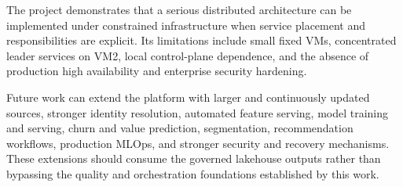 The project demonstrates that a serious distributed architecture can be implemented under constrained infrastructure when service placement and responsibilities are explicit. Its limitations include small fixed VMs, concentrated leader services on VM2, local control-plane dependence, and the absence of production high availability and enterprise security hardening.

Future work can extend the platform with larger and continuously updated sources, stronger identity resolution, automated feature serving, model training and serving, churn and value prediction, segmentation, recommendation workflows, production MLOps, and stronger security and recovery mechanisms. These extensions should consume the governed lakehouse outputs rather than bypassing the quality and orchestration foundations established by this work.